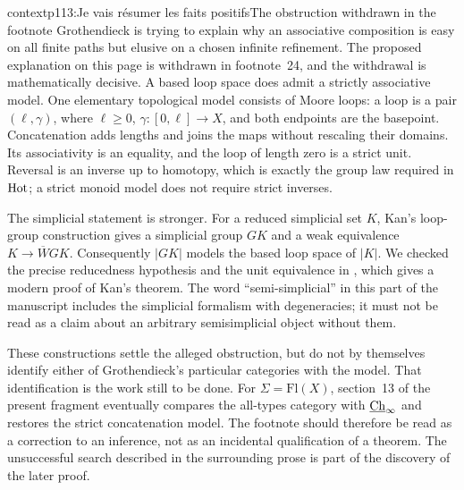 \begin{dcomment}{context}{p113:Je vais résumer les faits positifs}{The obstruction withdrawn in the footnote}
Grothendieck is trying to explain why an associative composition is easy on all finite paths but elusive on a chosen infinite refinement. The proposed explanation on this page is withdrawn in footnote~24, and the withdrawal is mathematically decisive. A based loop space does admit a strictly associative model. One elementary topological model consists of Moore loops: a loop is a pair $(\ell,\gamma)$, where $\ell\geq0$, $\gamma:[0,\ell]\to X$, and both endpoints are the basepoint. Concatenation adds lengths and joins the maps without rescaling their domains. Its associativity is an equality, and the loop of length zero is a strict unit. Reversal is an inverse up to homotopy, which is exactly the group law required in $\mathrm{Hot}$; a strict monoid model does not require strict inverses.

The simplicial statement is stronger. For a reduced simplicial set $K$, Kan's loop-group construction gives a simplicial group $GK$ and a weak equivalence $K\to\overline W GK$. Consequently $|GK|$ models the based loop space of $|K|$. We checked the precise reducedness hypothesis and the unit equivalence in \citet[Theorem~21]{Stevenson2012}, which gives a modern proof of Kan's theorem. The word ``semi-simplicial'' in this part of the manuscript includes the simplicial formalism with degeneracies; it must not be read as a claim about an arbitrary semisimplicial object without them.

These constructions settle the alleged obstruction, but do not by themselves identify either of Grothendieck's particular categories with the model. That identification is the work still to be done. For $\Sigma=\mathrm{Fl}(X)$, section~13 of the present fragment eventually compares the all-types category with $\underline{\mathrm{Ch}}_\infty$ and restores the strict concatenation model. The footnote should therefore be read as a correction to an inference, not as an incidental qualification of a theorem. The unsuccessful search described in the surrounding prose is part of the discovery of the later proof.
\end{dcomment}


